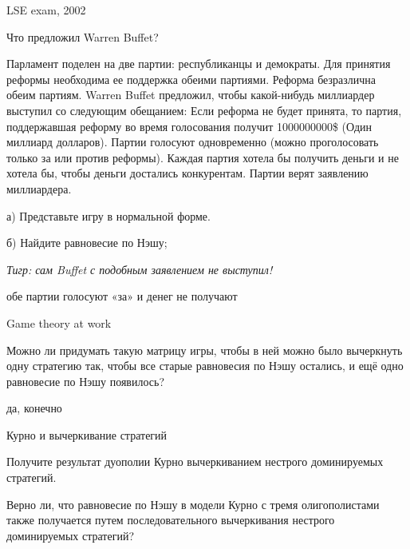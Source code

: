 \begin{source}
LSE exam, 2002
\end{source}



\begin{problem}
 Что предложил Warren Buffet? \par
Парламент поделен на две партии: республиканцы и демократы. Для принятия реформы необходима ее поддержка обеими партиями. Реформа безразлична обеим партиям. Warren Buffet предложил, чтобы какой-нибудь миллиардер выступил со следующим обещанием: Если реформа не будет принята, то партия, поддержавшая реформу во время голосования получит 1000000000\$ (Один миллиард долларов). Партии голосуют одновременно (можно проголосовать только за или против реформы). Каждая партия хотела бы получить деньги и не хотела бы, чтобы деньги достались конкурентам. Партии верят заявлению миллиардера.\par
а) Представьте игру в нормальной форме.\par
б) Найдите равновесие по Нэшу;\par
{\it Тигр: сам Buffet  с подобным заявлением не выступил!}




\begin{sol}
обе партии голосуют «за» и денег не получают
\end{sol}
\end{problem}


\begin{source}
Game theory at work
\end{source}



\begin{problem}
 Можно ли придумать такую матрицу игры, чтобы в ней можно было вычеркнуть одну стратегию так, чтобы все старые равновесия по Нэшу остались, и ещё одно равновесие по Нэшу появилось?



\begin{sol}
 да, конечно
\end{sol}
\end{problem}



\begin{problem}
 Курно и вычеркивание стратегий\par
Получите результат дуополии Курно вычеркиванием нестрого доминируемых стратегий.\par
Верно ли, что равновесие по Нэшу в модели Курно с тремя олигополистами также получается путем последовательного вычеркивания нестрого доминируемых стратегий?



\begin{sol}

\end{sol}
\end{problem}



